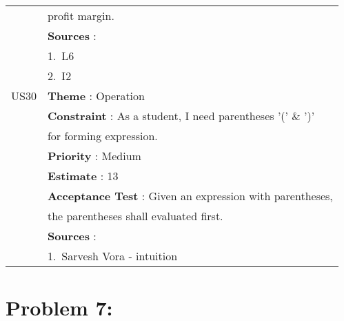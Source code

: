 \documentclass{article}
\begin{document}
\begin{longtable}{|| c || l ||}
         & profit margin.\\
         & \textbf{Sources} : \\
         & 1.~L6\\
         & 2.~I2 \\
         \hline
         US30 & \textbf{Theme} : Operation \\
         & \textbf{Constraint} : As a student, I need parentheses '(' \& ')' \\
         & for forming expression.\\
         & \textbf{Priority} : Medium \\
         & \textbf{Estimate} : 13 \\
         & \textbf{Acceptance Test} : Given an expression with parentheses, \\
         & the parentheses shall evaluated first.\\
         & \textbf{Sources} : \\
         & 1.~Sarvesh Vora - intuition\\
         \hline
         \hline
\end{longtable}
\newpage
\section{Problem 7:}
\end{document}
